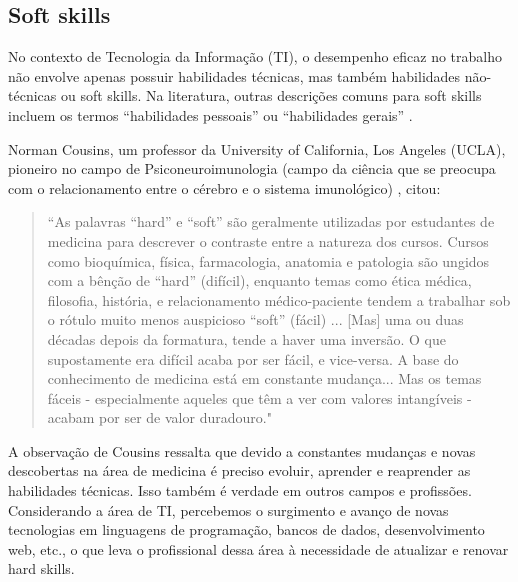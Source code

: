 \subsection{Soft skills}
\label{sec:ss}

No contexto de Tecnologia da Informação (TI), o desempenho eficaz no trabalho não envolve apenas possuir habilidades técnicas, mas também habilidades não-técnicas ou soft skills. Na literatura, outras descrições comuns para soft skills incluem os termos ``habilidades pessoais'' ou ``habilidades gerais'' \cite{joseph:99}.

Norman Cousins, um professor da University of California, Los Angeles (UCLA), pioneiro no campo de Psiconeuroimunologia (campo da ciência que se preocupa com o relacionamento entre o cérebro e o sistema imunológico) \cite{crosbie:05}, citou:

\begin{quote}
``As palavras ``hard'' e ``soft'' são geralmente utilizadas por estudantes de medicina para descrever o contraste entre a natureza dos cursos. Cursos como bioquímica, física, farmacologia, anatomia e patologia são ungidos com a bênção de ``hard'' (difícil), enquanto temas como ética médica, filosofia, história, e relacionamento médico-paciente tendem a trabalhar sob o rótulo muito menos auspicioso ``soft'' (fácil) 
... [Mas] uma ou duas décadas depois da formatura, tende a haver uma inversão. O que supostamente era difícil acaba por ser fácil, e vice-versa.
A base do conhecimento de medicina está em constante mudança... Mas os temas fáceis - especialmente aqueles que têm a ver com valores intangíveis - acabam por ser de valor duradouro."
\end{quote}

A observação de Cousins ressalta que devido a constantes mudanças e novas descobertas na área de medicina é preciso evoluir, aprender e reaprender as habilidades técnicas. Isso também é verdade em outros campos e profissões. Considerando a área de TI, percebemos o surgimento e avanço de novas tecnologias em linguagens de programação, bancos de dados, desenvolvimento web, etc., o que leva o profissional dessa área à necessidade de atualizar e renovar hard skills.

